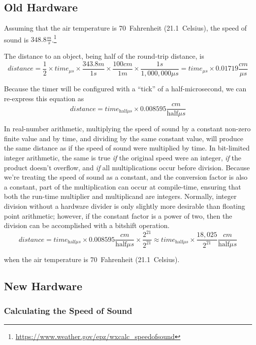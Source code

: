 \subsection{Old Hardware}

Assuming that the air temperature is 70\degree~Fahrenheit (21.1\degree~Celsius), the speed of sound is $348.8\frac{m}{s}$.\footnote{
    \url{https://www.weather.gov/epz/wxcalc_speedofsound}
}

The distance to an object, being half of the round-trip distance, is
\[
    distance = \frac{1}{2} \times time_{\mu s} \times \frac{343.8 m}{1 s} \times \frac{100 cm}{1 m} \times \frac{1 s}{1,000,000 \mu s} = time_{\mu s} \times 0.01719\frac{cm}{\mu s}
\]

Because the timer will be configured with a ``tick'' of a half-microsecond, we can re-express this equation as
\[
    distance = time_{\mathrm{half}\mu s} \times 0.008595\frac{cm}{\mathrm{half}\mu s}
\]

In real-number arithmetic, multiplying the speed of sound by a constant non-zero finite value and by time, and dividing by the same constant value, will produce the same distance as if the speed of sound were multiplied by time.
In bit-limited integer arithmetic, the same is true \textit{if} the original speed were an integer, \textit{if} the product doesn't overflow, and \textit{if} all multiplications occur before division.
Because we're treating the speed of sound as a constant, and the conversion factor is also a constant, part of the multiplication can occur at compile-time, ensuring that both the run-time multiplier and multiplicand are integers.
Normally, integer division without a hardware divider is only slightly more desirable than floating point arithmetic;
however, if the constant factor is a power of two, then the division can be accomplished with a bitshift operation.
\[
    distance = time_{\mathrm{half}\mu s} \times 0.008595\frac{cm}{\mathrm{half}\mu s} \times \frac{2^{21}}{2^{21}} \approx time_{\mathrm{half}\mu s} \times \frac{18,025}{2^{21}} \frac{cm}{\mathrm{half}\mu s}
\]

when the air temperature is 70\degree~Fahrenheit (21.1\degree~Celsius).

\subsection{New Hardware}

\subsubsection{Calculating the Speed of Sound}

